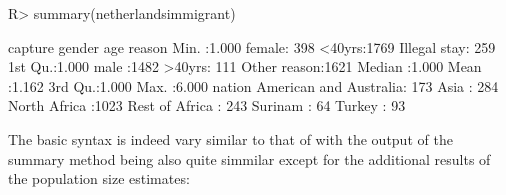 \documentclass[
]{jss}
\newcommand{\1}{\mathcal{I}} \newcommand{\bZero}{\boldsymbol{0}}
\begin{document}
\begin{CodeChunk}
\begin{CodeInput}
R> summary(netherlandsimmigrant)
\end{CodeInput}
\begin{CodeOutput}
    capture         gender         age                reason    
 Min.   :1.000   female: 398   <40yrs:1769   Illegal stay: 259  
 1st Qu.:1.000   male  :1482   >40yrs: 111   Other reason:1621  
 Median :1.000                                                  
 Mean   :1.162                                                  
 3rd Qu.:1.000                                                  
 Max.   :6.000                                                  
                    nation    
 American and Australia: 173  
 Asia                  : 284  
 North Africa          :1023  
 Rest of Africa        : 243  
 Surinam               :  64  
 Turkey                :  93  
\end{CodeOutput}
\end{CodeChunk}

The basic syntax is indeed vary similar to that of  with the
output of the summary method being also quite simmilar except for the
additional results of the population size estimates:
\end{document}
